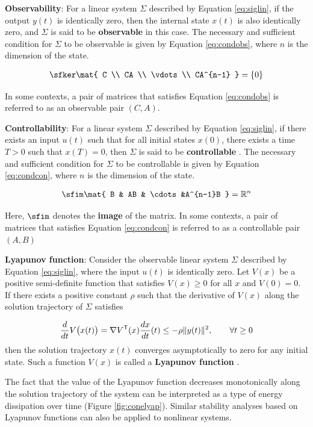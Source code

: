 \documentclass[graybox, envcountchap]{svmult}
\begin{document}
\begin{COLUMN}
\noindent \textbf{Observability}:
For a linear system $\Sigma$ described by Equation \ref{eq:siglin}, if the
output $y(t)$ is identically zero, then the internal state $x(t)$ is also
identically zero, and $\Sigma$ is said to be \textbf{observable}
 in this case. The necessary and sufficient condition for
$\Sigma$ to be observable is given by Equation \ref{eq:condobs}, where $n$ is
the dimension of the state.

\begin{align}\label{eq:condobs}
  \sfker \mat{
  C \\
  CA \\
  \vdots \\
  CA^{n-1}
  }
  =\{0\}
\end{align}

In some contexts, a pair of matrices that satisfies Equation \ref{eq:condobs} is
referred to as an observable pair $(C,A)$.

\smallskip
\noindent \textbf{Controllability}:
For a linear system $\Sigma$ described by Equation \ref{eq:siglin}, if there
exists an input $u(t)$ such that for all initial states $x(0)$, there exists a
time $T>0$ such that $x(T) = 0$, then $\Sigma$ is said to be
\textbf{controllable} . The necessary and sufficient
condition for $\Sigma$ to be controllable is given by Equation \ref{eq:condcon},
where $n$ is the dimension of the state.

\begin{align}\label{eq:condcon}
\sfim \mat{
B & AB & \cdots &A^{n-1}B
}
= \mathbb{R}^n
\end{align}

Here, $\sfim$ denotes the \textbf{image}  of the matrix. In some
contexts, a pair of matrices that satisfies Equation \ref{eq:condcon} is
referred to as a controllable pair $(A,B)$

\smallskip
\noindent \textbf{Lyapunov function}:
Consider the observable linear system $\Sigma$ described by Equation
\ref{eq:siglin}, where the input $u(t)$ is identically zero. Let $V(x)$ be a
positive semi-definite function that satisfies $V(x)\geq 0$ for all $x$ and
$V(0)=0$. If there exists a positive constant $\rho$ such that the derivative of
$V(x)$ along the solution trajectory of $\Sigma$ satisfies

\[
  \frac{d}{dt} V \bigl( x (t) \bigr) 
  =
  \nabla V^{\sf T}(x) \frac{d x}{dt} (t)
  \leq  - \rho \|y(t)\|^2,\qquad
  \forall t \geq0
\]
then the solution trajectory $x(t)$ converges asymptotically to zero for any initial state.
Such a function $V(x)$ is called a \textbf{Lyapunov function} .

The fact that the value of the Lyapunov function decreases monotonically along
the solution trajectory of the system can be interpreted as a type of energy
dissipation over time (Figure \ref{fig:conelyap}). Similar stability analyses
based on Lyapunov functions can also be applied to nonlinear systems.

\end{COLUMN}
\end{document}
